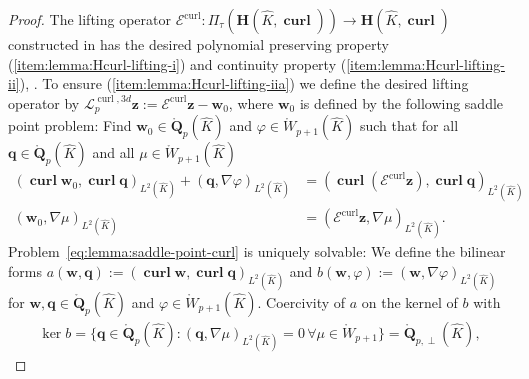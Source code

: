 \documentclass{article}
\begin{document}
\begin{proof}
The lifting operator $\boldsymbol{\mathcal{E}}^{\operatorname*{curl}}:\Pi_\tau({\mathbf H}(\widehat K,\operatorname{\mathbf{curl}})) \rightarrow {\mathbf H}(\widehat{K},\operatorname*{\mathbf{curl}})$ constructed in \cite{demkowicz-gopalakrishnan-schoeberl-II} has the desired polynomial preserving property (\ref{item:lemma:Hcurl-lifting-i}) and continuity property
(\ref{item:lemma:Hcurl-lifting-ii}), \cite[Thm.~{7.2}]%
{demkowicz-gopalakrishnan-schoeberl-II}. To ensure 
(\ref{item:lemma:Hcurl-lifting-iia}) we define the desired lifting operator 
by $\boldsymbol{\mathcal{L}}^{\operatorname*{curl},3d}_p\mathbf{z} := \boldsymbol{\mathcal{E}}^{\operatorname*{curl}}\mathbf{z}-\mathbf{w}_0$, 
where $\mathbf{w}_0$ is defined by the following saddle point problem: 
Find $\mathbf{w}_0\in \mathring{\mathbf{Q}}_p(\widehat{K})$ 
and $\varphi\in \mathring{W}_{p+1}(\widehat{K})$ such that
for all 
$\mathbf{q}\in \mathring{\mathbf{Q}}_p(\widehat{K})$ and all 
$\mu\in \mathring{W}_{p+1}(\widehat{K})$
\begin{subequations}
\label{eq:lemma:saddle-point-curl}
\begin{align}
\label{eq:lemma:saddle-point-curl-a}
(\operatorname*{\mathbf{curl}}\mathbf{w}_0,\operatorname*{\mathbf{curl}}\mathbf{q})_{L^2(\widehat{K})}  +  (\mathbf{q},\nabla\varphi)_{L^2(\widehat{K})} & =  (\operatorname*{\mathbf{curl}}(\boldsymbol{\mathcal{E}}^{\operatorname*{curl}}\mathbf{z}),\operatorname*{\mathbf{curl}}\mathbf{q})_{L^2(\widehat{K})} 
\\
\label{eq:lemma:saddle-point-curl-b}
(\mathbf{w}_0,\nabla\mu)_{L^2(\widehat{K})} & =  (\boldsymbol{\mathcal{E}}^{\operatorname*{curl}}\mathbf{z},\nabla\mu)_{L^2(\widehat{K})}. 
\end{align}
\end{subequations}
Problem~\eqref{eq:lemma:saddle-point-curl} is uniquely solvable: 
We define the bilinear forms 
$a(\mathbf{w},\mathbf{q}):=(\operatorname*{\mathbf{curl}}\mathbf{w},\operatorname*{\mathbf{curl}}\mathbf{q})_{L^2(\widehat{K})}$ 
and $b(\mathbf{w},\varphi) := (\mathbf{w},\nabla\varphi)_{L^2(\widehat{K})}$ 
for $\mathbf{w}, \mathbf{q}\in \mathring{\mathbf{Q}}_p(\widehat{K})$ and $\varphi\in \mathring{W}_{p+1}(\widehat{K})$. 
Coercivity of $a$ on the kernel of 
$b$ with
\begin{align*}
\operatorname*{ker}b=
\{\mathbf{q}\in \mathring{\mathbf{Q}}_p(\widehat{K})\colon (\mathbf{q},\nabla\mu)_{L^2(\widehat{K})} = 0 \, \forall\mu\in \mathring{W}_{p+1}\} = \mathring{\mathbf{Q}}_{p,\perp}(\widehat K),

\end{align*}
\end{proof}
\end{document}
